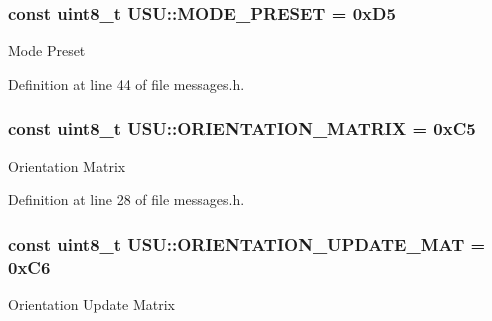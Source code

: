\hypertarget{namespace_u_s_u_afc9a1298a3210c69931db151aaf35de7}{
\subsubsection[{\-M\-O\-D\-E\-\_\-\-P\-R\-E\-S\-E\-T}]{\setlength{\rightskip}{0pt plus 5cm}const uint8\-\_\-t {\bf \-U\-S\-U\-::\-M\-O\-D\-E\-\_\-\-P\-R\-E\-S\-E\-T} = 0x\-D5}}\label{namespace_u_s_u_afc9a1298a3210c69931db151aaf35de7}
\-Mode \-Preset 

\-Definition at line 44 of file messages.\-h.

\hypertarget{namespace_u_s_u_a6bab14d28c02be2a8956e98d18b9b275}{
\subsubsection[{\-O\-R\-I\-E\-N\-T\-A\-T\-I\-O\-N\-\_\-\-M\-A\-T\-R\-I\-X}]{\setlength{\rightskip}{0pt plus 5cm}const uint8\-\_\-t {\bf \-U\-S\-U\-::\-O\-R\-I\-E\-N\-T\-A\-T\-I\-O\-N\-\_\-\-M\-A\-T\-R\-I\-X} = 0x\-C5}}\label{namespace_u_s_u_a6bab14d28c02be2a8956e98d18b9b275}
\-Orientation \-Matrix 

\-Definition at line 28 of file messages.\-h.

\hypertarget{namespace_u_s_u_a9d3464edac1b198f5c02658b36d083bb}{
\subsubsection[{\-O\-R\-I\-E\-N\-T\-A\-T\-I\-O\-N\-\_\-\-U\-P\-D\-A\-T\-E\-\_\-\-M\-A\-T}]{\setlength{\rightskip}{0pt plus 5cm}const uint8\-\_\-t {\bf \-U\-S\-U\-::\-O\-R\-I\-E\-N\-T\-A\-T\-I\-O\-N\-\_\-\-U\-P\-D\-A\-T\-E\-\_\-\-M\-A\-T} = 0x\-C6}}\label{namespace_u_s_u_a9d3464edac1b198f5c02658b36d083bb}
\-Orientation \-Update \-Matrix 


